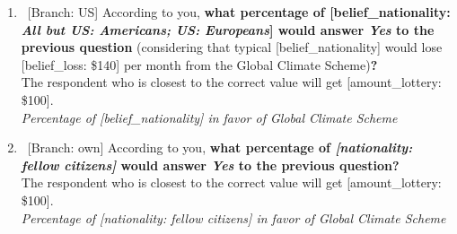 \begin{enumerate}[resume]
~\\\textbf{
Do you support the Global Climate Scheme?
} [\textit{Section \ref{subsec:ics}; Figures \ref{fig:ics}, \ref{fig:warm_glow_substitute}, \ref{fig:ncs_gcs_ics}}; 
\verb|gcs_support|]
  \\ \textit{Yes; No}\\\\
~[new page] [\textit{Two random branches: own; US}; \textit{Figure \ref{fig:ncs_gcs_ics}}; \verb|gcs_belief, variant_belief|] 
\item ~[Branch: US] \label{q:gcs_belief_us} According to you, \textbf{what percentage of [belief\_nationality: \textit{All but US: Americans; US: Europeans}] would answer \textit{Yes }to the previous question} (considering that typical [belief\_nationality] would lose [belief\_loss: \$140] per month from the Global Climate Scheme)\textbf{?}\\ The respondent who is closest to the correct value will get [amount\_lottery: \$100]. %
  \\ \textit{Percentage of [belief\_nationality] in favor of Global Climate Scheme}

\item ~[Branch: own] \label{q:gcs_belief_own} According to you, \textbf{what percentage of \textit{[nationality: fellow citizens]} would answer \textit{Yes }to the previous question?}\\ The respondent who is closest to the correct value will get [amount\_lottery: \$100]. %
  \\ \textit{Percentage of [nationality: fellow citizens] in favor of Global Climate Scheme}

\end{enumerate} 

